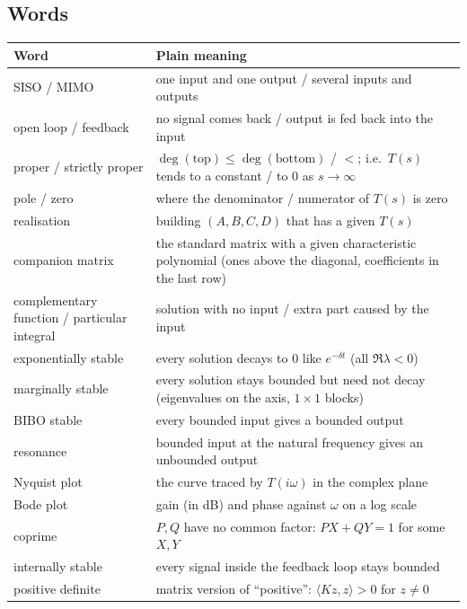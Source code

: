 \subsection*{Words}
\begin{center}
\renewcommand{\arraystretch}{1.35}
\small
\begin{tabular}{@{}p{3.6cm}p{11.6cm}@{}}
\toprule
\textbf{Word} & \textbf{Plain meaning}\\\midrule
SISO / MIMO & one input and one output / several inputs and outputs\\
open loop / feedback & no signal comes back / output is fed back into the input\\
proper / strictly proper & $\deg(\text{top})\le\deg(\text{bottom})$ / $<$; i.e.\ $T(s)$ tends to a constant / to $0$ as $s\to\infty$\\
pole / zero & where the denominator / numerator of $T(s)$ is zero\\
realisation & building $(A,B,C,D)$ that has a given $T(s)$\\
companion matrix & the standard matrix with a given characteristic polynomial (ones above the diagonal, coefficients in the last row)\\
complementary function / particular integral & solution with no input / extra part caused by the input\\
exponentially stable & every solution decays to 0 like $e^{-\delta t}$ (all $\Re\lambda<0$)\\
marginally stable & every solution stays bounded but need not decay (eigenvalues on the axis, $1\times1$ blocks)\\
BIBO stable & every bounded input gives a bounded output\\
resonance & bounded input at the natural frequency gives an unbounded output\\
Nyquist plot & the curve traced by $T(i\omega)$ in the complex plane\\
Bode plot & gain (in dB) and phase against $\omega$ on a log scale\\
coprime & $P,Q$ have no common factor: $PX+QY=1$ for some $X,Y$\\
internally stable & every signal inside the feedback loop stays bounded\\
positive definite & matrix version of ``positive'': $\langle Kz,z\rangle>0$ for $z\neq0$\\
\bottomrule
\end{tabular}
\end{center}

